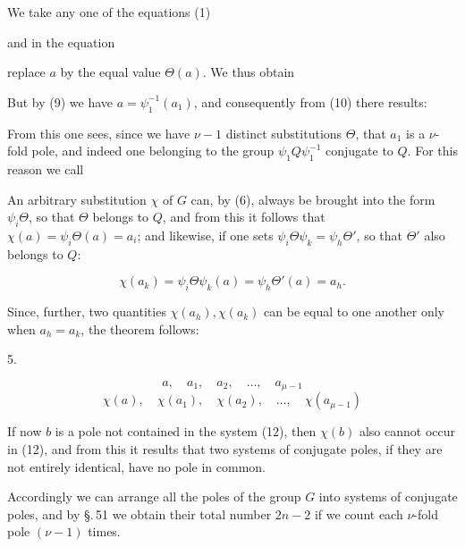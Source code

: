We take any one of the equations (1)


and in the equation


replace $a$ by the equal value $\Theta(a)$. We thus obtain


But by (9) we have $a = \psi_1^{-1}(a_1)$, and consequently from (10) there results:


From this one sees, since we have $\nu - 1$ distinct substitutions $\Theta$, that $a_1$ is a $\nu$-fold pole, and indeed one belonging to the group $\psi_1 Q \psi_1^{-1}$ conjugate to $Q$. For this reason we call



An arbitrary substitution $\chi$ of $G$ can, by (6), always be brought into the form $\psi_i \Theta$, so that $\Theta$ belongs to $Q$, and from this it follows that $\chi(a) = \psi_i \Theta(a) = a_i$; and likewise, if one sets $\psi_i \Theta \psi_k = \psi_h \Theta'$, so that $\Theta'$ also belongs to $Q$:

\[ \chi(a_k) = \psi_i \Theta \psi_k(a) = \psi_h \Theta'(a) = a_h. \]

Since, further, two quantities $\chi(a_h), \chi(a_k)$ can be equal to one another only when $a_h = a_k$, the theorem follows:

5. 

\[ a, \quad a_1, \quad a_2, \quad \ldots, \quad a_{\mu-1} \]
\[ \chi(a), \quad \chi(a_1), \quad \chi(a_2), \quad \ldots, \quad \chi(a_{\mu-1}) \]


If now $b$ is a pole not contained in the system (12), then $\chi(b)$ also cannot occur in (12), and from this it results that two systems of conjugate poles, if they are not entirely identical, have no pole in common.

Accordingly we can arrange all the poles of the group $G$ into systems of conjugate poles, and by \S.\,51 we obtain their total number $2n - 2$ if we count each $\nu$-fold pole $(\nu - 1)$ times.
